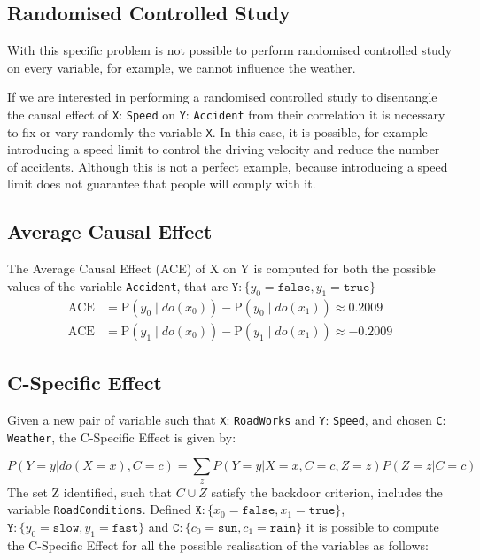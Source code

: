 \documentclass[a4paper,12pt]{article} %
\begin{document}
\subsection*{Randomised Controlled Study}
With this specific problem is not possible to perform randomised controlled study on every variable, for example, we cannot influence the weather.

If we are interested in performing a randomised controlled study to disentangle the causal effect of \texttt{X}: \texttt{Speed} on \texttt{Y}: \texttt{Accident} from their correlation it is necessary to fix or vary randomly the variable \texttt{X}. In this case, it is possible, for example introducing a speed limit to control the driving velocity and reduce the number of accidents. Although this is not a perfect example, because introducing a speed limit does not guarantee that people will comply with it.

\subsection*{Average Causal Effect}
The Average Causal Effect (ACE) of X on Y is computed for both the possible values of the variable \texttt{Accident}, that are $\mathtt{Y}: \{ y_0=\mathtt{false}, y_1=\mathtt{true}\}$ 
\begin{equation}
\begin{aligned}
\text{ACE}&=\text{P}(y_0 \mid {do}(x_0)) -\text{P}(y_0 \mid {do}(x_1)) \approx 0.2009
\\
\text{ACE}&=\text{P}(y_1 \mid {do}(x_0)) -\text{P}(y_1 \mid {do}(x_1)) \approx -0.2009
\end{aligned}
\end{equation}

\subsection*{C-Specific Effect}
Given a new pair of variable such that \texttt{X}: \texttt{RoadWorks} and \texttt{Y}: \texttt{Speed}, and chosen \texttt{C}: \texttt{Weather}, the C-Specific Effect is given by:

\begin{equation}
P(Y=y|do(X=x), C=c)= \sum_{z} P(Y=y|X=x, C=c, Z=z) P(Z=z|C=c)
\end{equation}
The set Z identified, such that $C \cup Z$ satisfy the backdoor criterion, includes the variable \texttt{RoadConditions}.
Defined $\mathtt{X}: \{ x_0=\mathtt{false}, x_1=\mathtt{true}\}$, $\mathtt{Y}: \{ y_0=\mathtt{slow}, y_1=\mathtt{fast}\}$ and $\mathtt{C}: \{ c_0=\mathtt{sun}, c_1=\mathtt{rain}\}$ it is possible to compute the C-Specific Effect for all the possible realisation of the variables as follows: 
\end{document}
